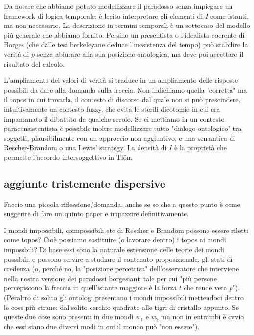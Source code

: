 \documentclass[a4paper, 11pt]{article}
\begin{document}
Da notare che abbiamo potuto modellizzare il paradosso senza impiegare un framework di logica temporale; è lecito interpretare gli elementi di $I$ come istanti, ma non necessario. La descrizione in termini temporali è un sottocaso del modello più generale che abbiamo fornito. Persino un presentista o l'idealista coerente di Borges (che dalle tesi berkeleyane deduce l'inesistenza del tempo) può stabilire la verità di $p$ senza abiurare alla sua posizione ontologica, ma deve poi accettare il risultato del calcolo. 

L'ampliamento dei valori di verità si traduce in un ampliamento delle risposte possibili da dare alla domanda sulla freccia. Non indichiamo quella "corretta" ma il topos in cui trovarla, il contesto di discorso dal quale non si può prescindere, intuitivamente un contesto fuzzy, che evita le sterili dicotomie in cui era impantanato il dibattito da qualche secolo.  Se ci mettiamo in un contesto paraconsistentista è possibile inoltre modellizzare tutto "dialogo ontologico" tra soggetti, plausibilmente con un approccio non aggiuntivo, e una semantica di Rescher-Brandom o una Lewis' strategy. La densità di $I$ è la proprietà che permette l'accordo intersoggettivo in Tl\"on. 

\subsection{aggiunte tristemente dispersive}

Faccio una piccola riflessione/domanda, anche se so che a questo punto è come suggerire di fare un quinto paper e impazzire definitivamente.

I mondi impossibili, coimpossibili etc di Rescher e Brandom possono essere riletti come topos? Cioè possiamo sostituire (o lavorare dentro) i topos ai mondi impossbili? Di base essi sono la naturale estensione delle teorie dei mondi possibili, e possono servire a studiare il contenuto proposizionale, gli stati di credenza (o, perché no, la "posizione percettiva" dell'osservatore che interviene nella nostra versione dei paradossi borgesiani; tale per cui "più persone percepiscono la freccia in quell'istante maggiore è la forza $t$ che rende vera $p$"). (Peraltro di solito gli ontologi presentano i mondi impossibili mettendoci dentro le cose più strane: dal solito cerchio quadrato alle tigri di cristallo appunto. Se queste due cose sono presenti in due mondi $w_1$ e $w_2$ ma non in entrambi è ovvio che essi siano due diversi modi in cui il mondo può "non essere").
\end{document}

